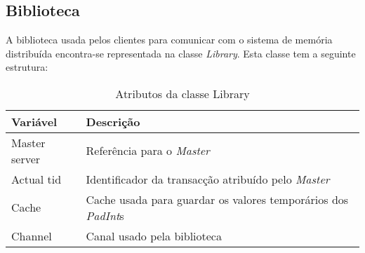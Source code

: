 \subsection{Biblioteca}
A biblioteca usada pelos clientes para comunicar com o sistema de memória distribuída encontra-se representada na classe \textit{Library}. Esta classe tem a seguinte estrutura:

\begin{table}[H]
\centering
\begin{tabular}{| p{2cm} | p{} |}
\hline
\textbf{Variável} & \textbf{Descrição} \\
\hline
Master server & Referência para o \textit{Master}  \\
\hline
Actual tid & Identificador da transacção atribuído pelo \textit{Master} \\
\hline
Cache & Cache usada para guardar os valores temporários dos \textit{PadInt}s \\
\hline
Channel & Canal usado pela biblioteca \\
\hline
\end{tabular}
\caption{Atributos da classe Library} \label{lib}
\end{table}

